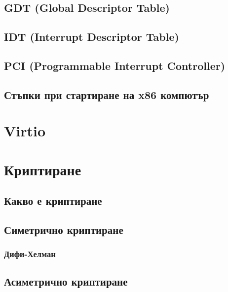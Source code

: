   \subsection{GDT (Global Descriptor Table)} \label{gdt}

  \subsection{IDT (Interrupt Descriptor Table)} \label{idt}

  \subsection{PCI (Programmable Interrupt Controller)} %

  \subsection{Стъпки при стартиране на x86 компютър}

\section{Virtio}

\section{Криптиране}
  \subsection{Какво е криптиране}

  \subsection{Симетрично криптиране}
    \subsubsection{Дифи-Хелман}

  \subsection{Асиметрично криптиране}

